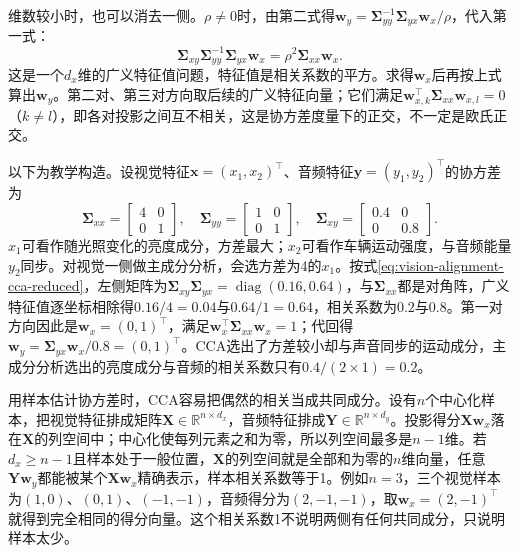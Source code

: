 维数较小时，也可以消去一侧。$\rho\ne0$时，由第二式得$\bm w_y=\bm\Sigma_{yy}^{-1}\bm\Sigma_{yx}\bm w_x/\rho$，代入第一式：
\begin{equation}
  \bm\Sigma_{xy}\bm\Sigma_{yy}^{-1}\bm\Sigma_{yx}\bm w_x
  =\rho^2\bm\Sigma_{xx}\bm w_x.
  \label{eq:vision-alignment-cca-reduced}
\end{equation}
这是一个$d_x$维的广义特征值问题，特征值是相关系数的平方。求得$\bm w_x$后再按上式算出$\bm w_y$。第二对、第三对方向取后续的广义特征向量；它们满足$\bm w_{x,k}^\top\bm\Sigma_{xx}\bm w_{x,l}=0$（$k\ne l$），即各对投影之间互不相关，这是协方差度量下的正交，不一定是欧氏正交。

\begin{example}[两维特征上的典型相关]
  \label{ex:vision-alignment-cca}
  以下为教学构造。设视觉特征$\bm x=(x_1,x_2)^\top$、音频特征$\bm y=(y_1,y_2)^\top$的协方差为
  \[
    \bm\Sigma_{xx}=\begin{bmatrix}4&0\\0&1\end{bmatrix},\quad
    \bm\Sigma_{yy}=\begin{bmatrix}1&0\\0&1\end{bmatrix},\quad
    \bm\Sigma_{xy}=\begin{bmatrix}0.4&0\\0&0.8\end{bmatrix}.
  \]
  $x_1$可看作随光照变化的亮度成分，方差最大；$x_2$可看作车辆运动强度，与音频能量$y_2$同步。对视觉一侧做主成分分析，会选方差为4的$x_1$。按式\eqref{eq:vision-alignment-cca-reduced}，左侧矩阵为$\bm\Sigma_{xy}\bm\Sigma_{yx}=\operatorname{diag}(0.16,0.64)$，与$\bm\Sigma_{xx}$都是对角阵，广义特征值逐坐标相除得$0.16/4=0.04$与$0.64/1=0.64$，相关系数为$0.2$与$0.8$。第一对方向因此是$\bm w_x=(0,1)^\top$，满足$\bm w_x^\top\bm\Sigma_{xx}\bm w_x=1$；代回得$\bm w_y=\bm\Sigma_{yx}\bm w_x/0.8=(0,1)^\top$。CCA选出了方差较小却与声音同步的运动成分，主成分分析选出的亮度成分与音频的相关系数只有$0.4/(2\times1)=0.2$。
\end{example}

用样本估计协方差时，CCA容易把偶然的相关当成共同成分。设有$n$个中心化样本，把视觉特征排成矩阵$\bm X\in\mathbb R^{n\times d_x}$，音频特征排成$\bm Y\in\mathbb R^{n\times d_y}$。投影得分$\bm X\bm w_x$落在$\bm X$的列空间中；中心化使每列元素之和为零，所以列空间最多是$n-1$维。若$d_x\geq n-1$且样本处于一般位置，$\bm X$的列空间就是全部和为零的$n$维向量，任意$\bm Y\bm w_y$都能被某个$\bm X\bm w_x$精确表示，样本相关系数等于1。例如$n=3$，三个视觉样本为$(1,0)$、$(0,1)$、$(-1,-1)$，音频得分为$(2,-1,-1)$，取$\bm w_x=(2,-1)^\top$就得到完全相同的得分向量。这个相关系数1不说明两侧有任何共同成分，只说明样本太少。

